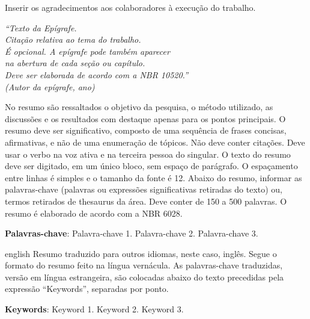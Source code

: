 \begin{agradecimentos}
	Inserir os agradecimentos aos colaboradores à execução do trabalho. 
\end{agradecimentos}

\begin{epigrafe}
	\vspace*{\fill}
	\begin{flushright}
		\textit{``Texto da Epígrafe.\\
			Citação relativa ao tema do trabalho.\\
			É opcional. A epígrafe pode também aparecer\\
			na abertura de cada seção ou capítulo.\\
			Deve ser elaborada de acordo com a NBR 10520.''\\
			(Autor da epígrafe, ano)}
	\end{flushright}
\end{epigrafe}

\setlength{\absparsep}{18pt} %
\begin{resumo}
	\SingleSpacing
	No resumo são ressaltados o objetivo da pesquisa, o método utilizado, as discussões e os resultados com destaque apenas para os pontos principais. O resumo deve ser significativo, composto de uma sequência de frases concisas, afirmativas, e não de uma enumeração de tópicos. Não deve conter citações. Deve usar o verbo na voz ativa e na terceira pessoa do singular. O texto do resumo deve ser digitado, em um único bloco, sem espaço de parágrafo. O espaçamento entre linhas é simples e o tamanho da fonte é 12. Abaixo do resumo, informar as palavras-chave (palavras ou expressões significativas retiradas do texto) ou, termos retirados de thesaurus da área. Deve conter de 150 a 500 palavras. O resumo é elaborado de acordo com a NBR 6028.
	
	\textbf{Palavras-chave}: Palavra-chave 1. Palavra-chave 2. Palavra-chave 3.
\end{resumo}

\begin{resumo}[Abstract]
	\SingleSpacing
	\begin{otherlanguage*}{english}
		Resumo traduzido para outros idiomas, neste caso, inglês. Segue o formato do resumo feito na língua vernácula. As palavras-chave traduzidas, versão em língua estrangeira, são colocadas abaixo do texto precedidas pela expressão “Keywords”, separadas por ponto.
		
		\textbf{Keywords}: Keyword 1. Keyword 2. Keyword 3.
	\end{otherlanguage*}
\end{resumo}

